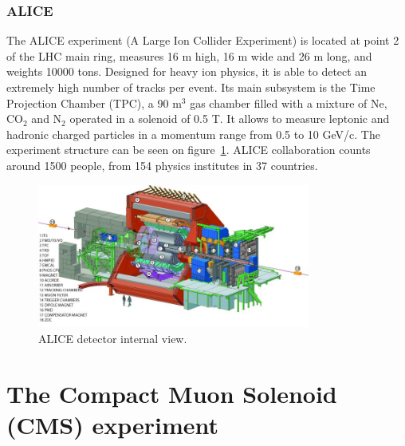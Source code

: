 
\subsubsection{ALICE}
\label{sec:alice}

The ALICE experiment (A Large Ion Collider Experiment) is located at point 2 of the LHC main ring, measures 16 m high, 16 m wide and 26 m long, and weights 10000 tons. Designed for heavy ion physics, it is able to detect an extremely high number of tracks per event. Its main subsystem is the Time Projection Chamber (TPC), a 90 $\text{m}^{3}$ gas chamber filled with a mixture of Ne, $\text{CO}_{2}$ and $\text{N}_{2}$ operated in a solenoid of 0.5 T. It allows to measure leptonic and hadronic charged particles in a momentum range from 0.5 to 10 GeV/c. The experiment structure can be seen on figure~\ref{fig:alicedet}. ALICE collaboration counts around 1500 people, from 154 physics institutes in 37 countries.

\begin{figure}[!Hhtbp]
  \begin{center}
    \includegraphics[width=0.8\textwidth]{figs/alice2.jpg}
    \caption{ALICE detector internal view. }
    \label{fig:alicedet}
  \end{center}
\end{figure}

\section{The Compact Muon Solenoid (CMS) experiment}
\label{sec:CMS}

